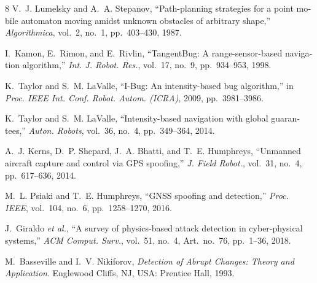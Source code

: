\documentclass[11pt, a4paper]{article}
\begin{document}
\begin{otherlanguage}{english}
\begin{thebibliography}{8}
\footnotesize
\setlength{\itemsep}{0pt}
V.~J. Lumelsky and A.~A. Stepanov, ``Path-planning strategies for a point mobile automaton moving amidst unknown obstacles of arbitrary shape,'' \textit{Algorithmica}, vol.~2, no.~1, pp.~403--430, 1987.

I.~Kamon, E.~Rimon, and E.~Rivlin, ``TangentBug: A range-sensor-based navigation algorithm,'' \textit{Int. J. Robot. Res.}, vol.~17, no.~9, pp.~934--953, 1998.

K.~Taylor and S.~M. LaValle, ``I-Bug: An intensity-based bug algorithm,'' in \textit{Proc. IEEE Int. Conf. Robot. Autom. (ICRA)}, 2009, pp.~3981--3986.

K.~Taylor and S.~M. LaValle, ``Intensity-based navigation with global guarantees,'' \textit{Auton. Robots}, vol.~36, no.~4, pp.~349--364, 2014.

A.~J. Kerns, D.~P. Shepard, J.~A. Bhatti, and T.~E. Humphreys, ``Unmanned aircraft capture and control via GPS spoofing,'' \textit{J. Field Robot.}, vol.~31, no.~4, pp.~617--636, 2014.

M.~L. Psiaki and T.~E. Humphreys, ``GNSS spoofing and detection,'' \textit{Proc. IEEE}, vol.~104, no.~6, pp.~1258--1270, 2016.

J.~Giraldo \textit{et al.}, ``A survey of physics-based attack detection in cyber-physical systems,'' \textit{ACM Comput. Surv.}, vol.~51, no.~4, Art.~no.~76, pp.~1--36, 2018.

M.~Basseville and I.~V. Nikiforov, \textit{Detection of Abrupt Changes: Theory and Application}. Englewood Cliffs, NJ, USA: Prentice Hall, 1993.
\end{thebibliography}
\end{otherlanguage}
\end{document}
